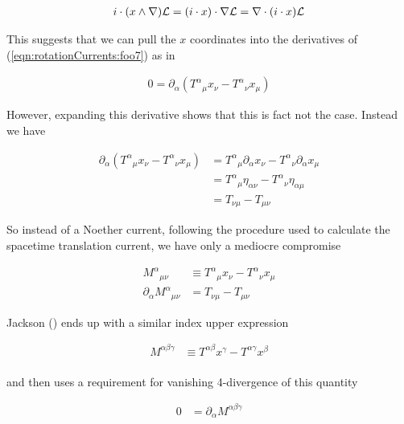 \begin{align}\label{eqn:rotationCurrents:foo8}
i \cdot (x \wedge \nabla) \mathcal{L} = (i \cdot x) \cdot \nabla \mathcal{L} = \nabla \cdot (i \cdot x) \mathcal{L}
\end{align}

This suggests that we can pull the $x$ coordinates into the derivatives of (\ref{eqn:rotationCurrents:foo7}) as in

\begin{align}\label{eqn:rotationCurrents:foo9}
0 = \partial_\alpha \left( {T^\alpha}_\mu x_\nu - {T^\alpha}_\nu x_\mu \right)
\end{align}

However, expanding this derivative shows that this is fact not the case.  Instead we have

\begin{align*}
\partial_\alpha \left( {T^\alpha}_\mu x_\nu - {T^\alpha}_\nu x_\mu \right) 
&=
{T^\alpha}_\mu \partial_\alpha x_\nu 
- {T^\alpha}_\nu \partial_\alpha x_\mu  \\
&=
{T^\alpha}_\mu \eta_{\alpha\nu}
- {T^\alpha}_\nu \eta_{\alpha\mu}  \\
&=
T_{\nu\mu} - T_{\mu\nu}
\end{align*}

So instead of a Noether current, following the procedure used to calculate the spacetime translation current, we have only a mediocre compromise

\begin{align}\label{eqn:rotationCurrents:foo10}
{M^{\alpha}}_{\mu\nu} &\equiv {T^\alpha}_\mu x_\nu - {T^\alpha}_\nu x_\mu \\
\partial_\alpha {M^{\alpha}}_{\mu\nu} &= T_{\nu\mu} - T_{\mu\nu}
\end{align}

Jackson (\cite{jackson1975cew}) ends up with a similar index upper expression

\begin{align}\label{eqn:rotationCurrents:foo11}
M^{\alpha\beta\gamma} &\equiv T^{\alpha\beta} x^\gamma - T^{\alpha\gamma} x^\beta \\
\end{align}

and then uses a requirement for vanishing 4-divergence of this quantity 

\begin{align}\label{eqn:rotationCurrents:foo12}
0 &= \partial_\alpha M^{\alpha\beta\gamma}
\end{align}

